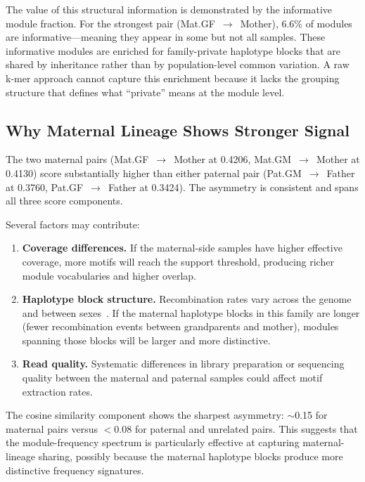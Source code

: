 \documentclass{../yalumba}
\begin{document}
The value of this structural information is demonstrated by the informative
module fraction.  For the strongest pair (Mat.GF~$\to$~Mother), 6.6\% of
modules are informative---meaning they appear in some but not all samples.
These informative modules are enriched for family-private haplotype blocks
that are shared by inheritance rather than by population-level common
variation.  A raw k-mer approach cannot capture this enrichment because it
lacks the grouping structure that defines what ``private'' means at the
module level.

\subsection{Why Maternal Lineage Shows Stronger Signal}

The two maternal pairs (Mat.GF~$\to$~Mother at 0.4206, Mat.GM~$\to$~Mother at
0.4130) score substantially higher than either paternal pair
(Pat.GM~$\to$~Father at 0.3760, Pat.GF~$\to$~Father at 0.3424).  The
asymmetry is consistent and spans all three score components.

Several factors may contribute:

\begin{enumerate}
  \item \textbf{Coverage differences.}  If the maternal-side samples have
        higher effective coverage, more motifs will reach the support threshold,
        producing richer module vocabularies and higher overlap.

  \item \textbf{Haplotype block structure.}  Recombination rates vary across
        the genome and between sexes~\cite{1000genomes2015}.  If the maternal
        haplotype blocks in this family are longer (fewer recombination events
        between grandparents and mother), modules spanning those blocks will
        be larger and more distinctive.

  \item \textbf{Read quality.}  Systematic differences in library preparation
        or sequencing quality between the maternal and paternal samples could
        affect motif extraction rates.
\end{enumerate}


The cosine similarity component shows the sharpest asymmetry: $\sim$0.15 for
maternal pairs versus $<$0.08 for paternal and unrelated pairs.  This suggests
that the module-frequency spectrum is particularly effective at capturing
maternal-lineage sharing, possibly because the maternal haplotype blocks
produce more distinctive frequency signatures.
\end{document}
